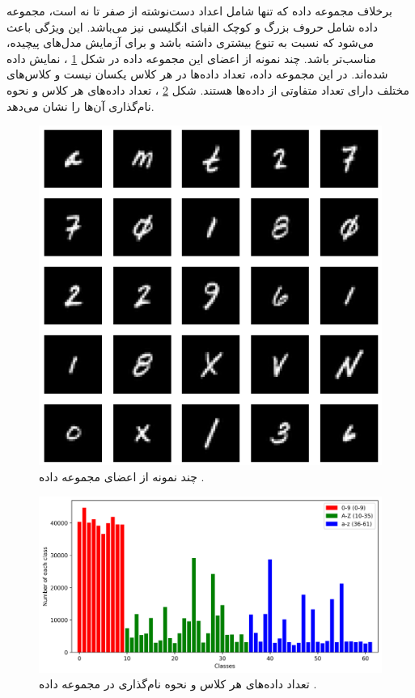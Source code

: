 برخلاف مجموعه داده
که تنها شامل اعداد دست‌نوشته از صفر تا نه است، مجموعه داده
شامل حروف بزرگ و کوچک الفبای انگلیسی نیز می‌باشد. این ویژگی باعث می‌شود که
نسبت به
تنوع بیشتری داشته باشد و برای آزمایش مدل‌های پیچیده‌، مناسب‌تر باشد.
چند نمونه از اعضای این مجموعه داده در شکل
\ref{femnist}%
، نمایش داده شده‌اند.
در این مجموعه داده، تعداد داده‌ها در هر کلاس یکسان نیست و کلاس‌های مختلف دارای تعداد متفاوتی از داده‌ها هستند. شکل
\ref{count_all_classes}%
، تعداد داده‌های هر کلاس و نحوه نام‌گذاری آن‌ها را نشان می‌دهد.


\begin{figure}[b!]
	\centering
	\includegraphics[scale=0.5]{images/chap5/femnist.png}%
	\caption{%
		چند نمونه از اعضای مجموعه داده
		\cite{holzer2023dynamically}.
	}
	\label{femnist}
	\centering
\end{figure}


\begin{figure}[t]
	\centering
	\includegraphics[scale=0.7]{images/chap5/count_all_classes.png}%
	\caption{%
تعداد داده‌های هر کلاس و نحوه نام‌گذاری در مجموعه داده
		.
	}
	\label{count_all_classes}
	\centering
\end{figure}

